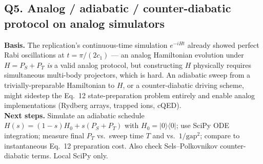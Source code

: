 \subsection*{Q5. Analog / adiabatic / counter-diabatic protocol on analog simulators}
\textbf{Basis.} The replication's continuous-time simulation $e^{-iHt}$ already
showed perfect Rabi oscillations at $t = \pi/(2 c_1)$ --- an analog Hamiltonian
evolution under $H = P_S + P_T$ \emph{is} a valid analog protocol, but constructing
$H$ physically requires simultaneous multi-body projectors, which is hard. An
adiabatic sweep from a trivially-preparable Hamiltonian to $H$, or a
counter-diabatic driving scheme, might sidestep the Eq.~12 state-preparation
problem entirely and enable analog implementations (Rydberg arrays, trapped ions,
cQED).\\
\textbf{Next steps.} Simulate an adiabatic schedule $H(s) = (1-s) H_0 + s (P_S + P_T)$
with $H_0 = |0\rangle\langle 0|$; use SciPy ODE integration; measure final $P_T$
vs.\ sweep time $T$ and vs.\ $1/\mathrm{gap}^2$; compare to instantaneous Eq.~12
preparation cost. Also check Sels--Polkovnikov counter-diabatic terms. Local SciPy
only.
